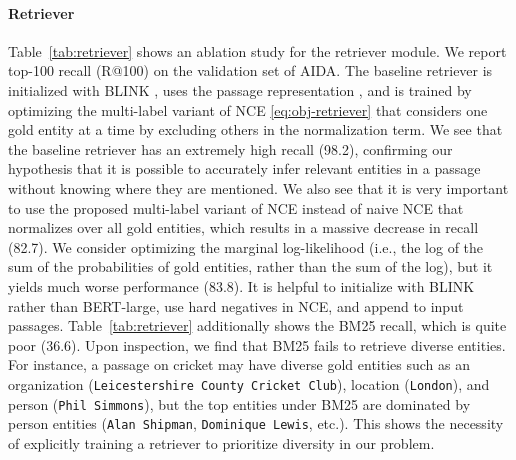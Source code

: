 \documentclass{article} \clearpage{}\usepackage{amsmath,amssymb,amsthm,bbm}
\theoremstyle{definition}
\begin{document}
\paragraph{Retriever}
Table~\ref{tab:retriever} shows an ablation study for the retriever module. We report top-100 recall (R@100) on the validation set of AIDA.
The baseline retriever is initialized with BLINK \citep{wu2020scalable},
uses the passage representation , and is trained by optimizing the multi-label variant of NCE \eqref{eq:obj-retriever}
that considers one gold entity at a time by excluding others in the normalization term.
We see that the baseline retriever has an extremely high recall (98.2),
confirming our hypothesis that it is possible to accurately infer relevant entities in a passage without knowing where they are mentioned.
We also see that it is very important to use the proposed multi-label variant of NCE instead of naive NCE that normalizes over all gold entities, which results in a massive decrease in recall (82.7).
We consider optimizing the marginal log-likelihood (i.e., the log of the sum of the probabilities of gold entities, rather than the sum of the log),
but it yields much worse performance (83.8).
It is helpful to initialize with BLINK rather than BERT-large, use hard negatives in NCE, and append  to input passages.
Table~\ref{tab:retriever} additionally shows the BM25 recall, which is quite poor (36.6).
Upon inspection, we find that BM25 fails to retrieve diverse entities.
For instance, a passage on cricket may have diverse gold entities such as an organization (\texttt{Leicestershire County Cricket Club}), location (\texttt{London}),
and person (\texttt{Phil Simmons}), but the top entities under BM25 are dominated by person entities (\texttt{Alan Shipman}, \texttt{Dominique Lewis}, etc.).
This shows the necessity of explicitly training a retriever to prioritize diversity in our problem.
\end{document}

